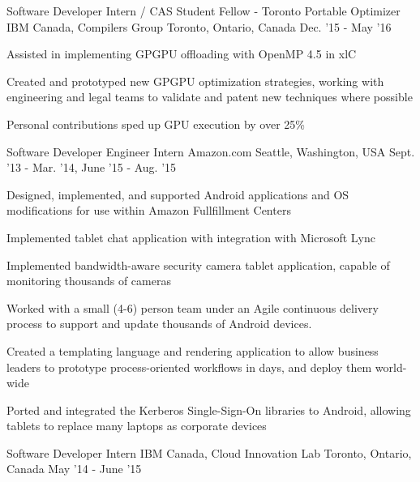 \begin{cventries}
\cventry
    {Software Developer Intern / CAS Student Fellow - Toronto Portable Optimizer} %
    {IBM Canada, Compilers Group} %
    {Toronto, Ontario, Canada} %
    {Dec. '15 - May '16} %
    {
        \begin{cvitems}
            \item Assisted in implementing GPGPU offloading with OpenMP 4.5 in xlC
            \item Created and prototyped new GPGPU optimization strategies, working with engineering and legal teams to validate and patent new techniques where possible
            \item Personal contributions sped up GPU execution by over 25\%
        \end{cvitems}
    }
\vspace{4mm}
\cventry
    {Software Developer Engineer Intern} %
    {Amazon.com} %
    {Seattle, Washington, USA} %
    {Sept. '13 - Mar. '14,
    June '15 - Aug. '15} %
    {
        \begin{cvitems}
            \item Designed, implemented, and supported Android applications and OS modifications for use within Amazon Fullfillment Centers
            \item Implemented tablet chat application with integration with Microsoft Lync
            \item Implemented bandwidth-aware security camera tablet application, capable of monitoring thousands of cameras
            \item Worked with a small (4-6) person team under an Agile continuous delivery process to support and update thousands of Android devices.
            \item Created a templating language and rendering application to allow business leaders to prototype process-oriented workflows in days, and deploy them world-wide
            \item Ported and integrated the Kerberos Single-Sign-On libraries to Android, allowing tablets to replace many laptops as corporate devices
        \end{cvitems}
    }
\vspace{4mm}
\cventry
    {Software Developer Intern} %
    {IBM Canada, Cloud Innovation Lab} %
    {Toronto, Ontario, Canada} %
    {May '14 - June '15} %
    {
}
\end{cventries}
